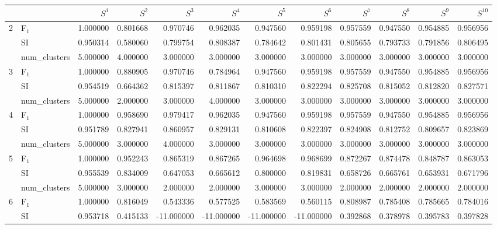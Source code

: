 \begin{tabular}{llrrrrrrrrrr}
\toprule
 &  & $S^{1}$ & $S^{2}$ & $S^{3}$ & $S^{4}$ & $S^{5}$ & $S^{6}$ & $S^{7}$ & $S^{8}$ & $S^{9}$ & $S^{10}$ \\
\midrule
\multirow[c]{3}{*}{2} & F$_1$ & 1.000000 & 0.801668 & 0.970746 & 0.962035 & 0.947560 & 0.959198 & 0.957559 & 0.947550 & 0.954885 & 0.956956 \\
 & SI & 0.950314 & 0.580060 & 0.799754 & 0.808387 & 0.784642 & 0.801431 & 0.805655 & 0.793733 & 0.791856 & 0.806495 \\
 & num_clusters & 5.000000 & 4.000000 & 3.000000 & 3.000000 & 3.000000 & 3.000000 & 3.000000 & 3.000000 & 3.000000 & 3.000000 \\
\multirow[c]{3}{*}{3} & F$_1$ & 1.000000 & 0.880905 & 0.970746 & 0.784964 & 0.947560 & 0.959198 & 0.957559 & 0.947550 & 0.954885 & 0.956956 \\
 & SI & 0.954519 & 0.664362 & 0.815397 & 0.811867 & 0.810310 & 0.822294 & 0.825708 & 0.815052 & 0.812820 & 0.827571 \\
 & num_clusters & 5.000000 & 2.000000 & 3.000000 & 4.000000 & 3.000000 & 3.000000 & 3.000000 & 3.000000 & 3.000000 & 3.000000 \\
\multirow[c]{3}{*}{4} & F$_1$ & 1.000000 & 0.958690 & 0.979417 & 0.962035 & 0.947560 & 0.959198 & 0.957559 & 0.947550 & 0.954885 & 0.956956 \\
 & SI & 0.951789 & 0.827941 & 0.860957 & 0.829131 & 0.810608 & 0.822397 & 0.824908 & 0.812752 & 0.809657 & 0.823869 \\
 & num_clusters & 5.000000 & 3.000000 & 4.000000 & 3.000000 & 3.000000 & 3.000000 & 3.000000 & 3.000000 & 3.000000 & 3.000000 \\
\multirow[c]{3}{*}{5} & F$_1$ & 1.000000 & 0.952243 & 0.865319 & 0.867265 & 0.964698 & 0.968699 & 0.872267 & 0.874478 & 0.848787 & 0.863053 \\
 & SI & 0.955539 & 0.834009 & 0.647053 & 0.665612 & 0.800000 & 0.819831 & 0.658726 & 0.665761 & 0.653931 & 0.671796 \\
 & num_clusters & 5.000000 & 3.000000 & 2.000000 & 2.000000 & 3.000000 & 3.000000 & 2.000000 & 2.000000 & 2.000000 & 2.000000 \\
\multirow[c]{3}{*}{6} & F$_1$ & 1.000000 & 0.816049 & 0.543336 & 0.577525 & 0.583569 & 0.560115 & 0.808987 & 0.785408 & 0.785665 & 0.784016 \\
 & SI & 0.953718 & 0.415133 & -11.000000 & -11.000000 & -11.000000 & -11.000000 & 0.392868 & 0.378978 & 0.395783 & 0.397828 \\

\end{tabular}
